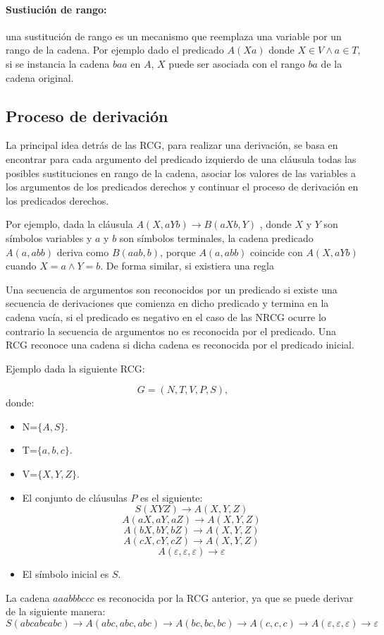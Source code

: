 \paragraph{Sustiución de rango:} una sustitución de rango es un mecanismo que reemplaza una variable por un rango de la cadena.
Por ejemplo dado el predicado $A(Xa)$ donde $X \in V \wedge a \in T$, si se instancia la cadena $baa$ en $A$, $X$ puede
ser asociada con el rango $ba$ de la cadena original.

\subsection{Proceso de derivación}

La principal idea detrás de las RCG, para realizar una derivación, se basa en encontrar para cada argumento del predicado izquierdo de una cláusula todas las
posibles sustituciones en rango de la cadena, asociar los valores de las variables a los argumentos de los predicados derechos y continuar
el proceso de derivación en los predicados derechos.

Por ejemplo, dada la cláusula $A(X,aYb)\to B(aXb,Y)$ , donde $X$ y $Y$ son símbolos variables y $a$ y $b$
son símbolos terminales, la cadena predicado $A(a,abb)$ deriva como $B(aab,b)$, porque $A(a,abb)$
coincide con $A(X,aYb)$ cuando $ X=a \wedge Y=b$. De forma similar, si existiera una regla

Una secuencia de argumentos son reconocidos por un predicado si existe una secuencia de derivaciones que comienza
en dicho predicado y termina en la cadena vacía, si el predicado es negativo en el caso de las NRCG ocurre lo contrario
la secuencia de argumentos no es reconocida por el predicado. Una RCG reconoce una cadena si dicha cadena es reconocida
por el predicado inicial.

Ejemplo dada la siguiente RCG:

\[
    G = (N, T, V, P, S),
\]
donde:

\begin{itemize}
    \item  N=$\{A,S\}$.
    \item T=$\{a,b,c\}$.
    \item V=$\{X,Y,Z\}$.
    \item El conjunto de cláusulas $P$ es el siguiente:
          $$S(XYZ)\to A(X,Y,Z)$$
          $$A(aX,aY,aZ)\to A(X,Y,Z)$$
          $$A(bX,bY,bZ)\to A(X,Y,Z)$$
          $$A(cX,cY,cZ)\to A(X,Y,Z)$$
          $$A(\varepsilon,\varepsilon,\varepsilon)\to \varepsilon$$
    \item El símbolo inicial es $S$.
\end{itemize}
La cadena $aaabbbccc$ es reconocida por la RCG anterior, ya que se puede derivar de la siguiente manera:
$$S(abcabcabc)\to A(abc,abc,abc)\to A(bc,bc,bc)\to A(c,c,c)\to A(\varepsilon,\varepsilon,\varepsilon)\to \varepsilon$$

